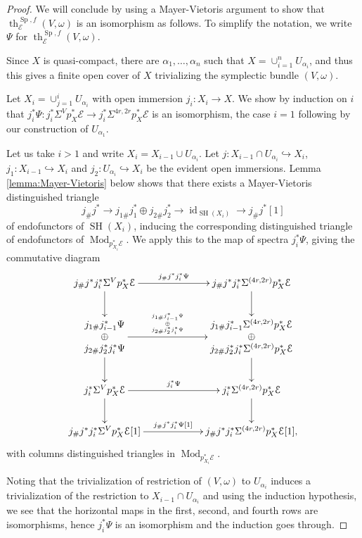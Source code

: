 \documentclass[10pt]{amsart}
\theoremstyle{definition}
\theoremstyle{plain}
\numberwithin{equation}{section}
\newcommand{\0}{\emptyset}
\newcommand{\sE}{{\mathcal E}}
\newcommand{\Sp}{{\operatorname{Sp}}}
\newcommand{\SH}{{\operatorname{SH}}}
\renewcommand{\th}{{\operatorname{th}}}
\newcommand{\Mod}{{\operatorname{Mod}}}
\newcommand{\id}{{\operatorname{id}}}
\begin{document}
\begin{proof}
We will conclude by using a Mayer-Vietoris argument to show that $\th^{\Sp,f}_{\sE}(V,\omega)$ is an isomorphism as follows. To simplify the notation, we write $\Psi$ for $\th^{\Sp,f}_{\sE}(V,\omega)$. 

Since $X$ is quasi-compact, there are  $\alpha_1,\ldots, \alpha_n$ such that $X=\cup_{i=1}^nU_{\alpha_i}$, and thus this gives a finite open cover of $X$ trivializing the symplectic bundle $(V,\omega)$. 

Let $X_i=\cup_{j=1}^iU_{\alpha_i}$ with open immersion $j_i:X_i\to X$. We show by induction on $i$ that $j_i^*\Psi:j_i^*\Sigma^Vp_X^*\sE\to j_i^*\Sigma^{4r,2r}p_X^*\sE$ is an isomorphism, the case $i=1$ following by our construction of $U_{\alpha_1}$.

Let us take $i>1$ and write $X_i=X_{i-1}\cup U_{\alpha_i}$.  Let $j:X_{i-1}\cap U_{\alpha_i}\hookrightarrow X_i$, $j_1:X_{i-1}\hookrightarrow X_i$ and $j_2:U_{\alpha_i}\hookrightarrow X_i$ be the evident open immersions. Lemma \ref{lemma:Mayer-Vietoris} below shows that there exists a Mayer-Vietoris  distinguished triangle 
\begin{equation}
\label{eq:Mayer-Vietoris}
    j_\#j^* \to j_{1\#}j_1^* \oplus j_{2\#}j_2^* \to \id_{\SH(X_i)}\to  j_\#j^*[1]
\end{equation}
of endofunctors of $\SH(X_i)$, inducing the corresponding distinguished triangle of endofunctors of $\Mod_{p_{X_i}^*\sE}$. We apply this to the map of spectra $j_i^*\Psi$, giving the commutative diagram
\[
\xymatrixcolsep{60pt}
\xymatrix{
j_\#j^*j_i^*\Sigma^Vp_X^*\sE\ar[d]\ar[r]^-{j_\#j^*j_i^*\Psi}&j_\#j^*j_i^*\Sigma^{(4r,2r)}p_X^*\sE\ar[d]\\
\hbox{$\begin{matrix}j_{1\#}j_{i-1}^*\Psi\\\oplus\\ j_{2\#}j_2^*j_i^*\Psi\end{matrix}$}\ar[d]\ar[r]^-{\tiny\begin{matrix}j_{1\#} j_{i-1}^*\Psi\\
\oplus\\
 j_{2\#}j_2^*j_i^*\Psi\end{matrix}}&\hbox{$\begin{matrix}j_{1\#}j_{i-1}^*\Sigma^{(4r,2r)}p_X^*\sE\\\oplus \\j_{2\#}j_2^*j_i^*\Sigma^{(4r,2r)}p_X^*\sE\end{matrix}$}\ar[d]\\
j_i^*\Sigma^Vp_X^*\sE\ar[d]\ar[r]^-{j_i^*\Psi}&j_i^*\Sigma^{(4r,2r)}p_X^*\sE\ar[d]\\
j_\#j^*j_i^*\Sigma^Vp_X^*\sE[1]\ar[r]^-{j_\#j^*j_i^*\Psi[1]}&j_\#j^*j_i^*\Sigma^{(4r,2r)}p_X^*\sE[1], 
}
\]
with columns distinguished triangles in $\Mod_{p_{X_i}^*\sE}$.

Noting that the trivialization of restriction of $(V,\omega)$ to $U_{\alpha_i}$ induces a trivialization of the restriction to $X_{i-1}\cap U_{\alpha_i}$ and using the induction hypothesis, we see that the horizontal maps in the first, second, and fourth rows are isomorphisms, hence
$j_i^*\Psi$ is an isomorphism and the induction goes through. 
\end{proof}
\end{document}
